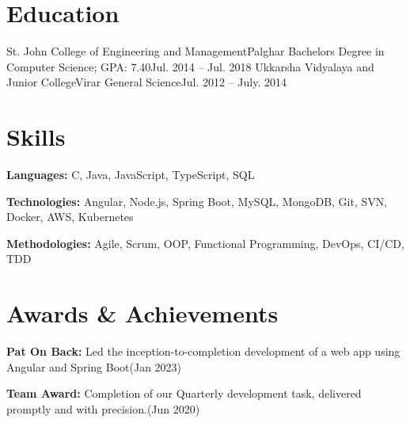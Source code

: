 \documentclass{resume}
\begin{document}

\resumeItemListEnd

\resumeSubHeadingListEnd

\section{Education}
  \resumeSubHeadingListStart
    \resumeSubheading
      {St. John College of Engineering and Management}{Palghar}
      {Bachelors Degree in Computer Science;  GPA: 7.40}{Jul. 2014 -- Jul. 2018}
    \resumeSubheading
      {Ukkarsha Vidyalaya and Junior College}{Virar}
      {General Science}{Jul. 2012 -- July. 2014}
  \resumeSubHeadingListEnd




\section{Skills}
  \resumeSubHeadingListStart
    \small{\item{
        
        \textbf{Languages:}{ C, Java, JavaScript, TypeScript, SQL} \\ \vspace{3pt}
        
        \textbf{Technologies:}{ Angular, Node.js, Spring Boot, MySQL, MongoDB, Git, SVN, Docker, AWS, Kubernetes} \\ \vspace{3pt}
        
        \textbf{Methodologies:}{ Agile, Scrum, OOP, Functional Programming, DevOps, CI/CD, TDD} \\ \vspace{3pt}
        
    }}
  \resumeSubHeadingListEnd


\section{Awards \& Achievements}
  \resumeSubHeadingListStart
    \small{\item{
        \textbf{Pat On Back:}{ Led the inception-to-completion development of a web app using Angular and Spring Boot(Jan 2023)} \\ \vspace{3pt}

        \textbf{Team Award:}{ Completion of our Quarterly development task, delivered promptly and with precision.(Jun 2020)} \\ \vspace{3pt}
        
    }}
  \resumeSubHeadingListEnd
\end{document}
